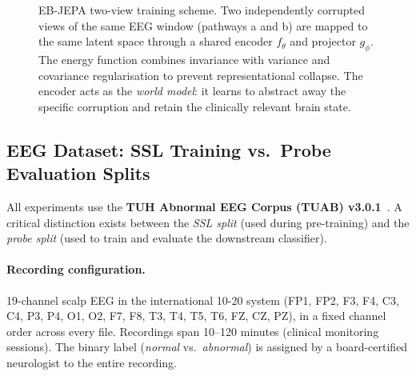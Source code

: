 \documentclass[11pt,a4paper]{article}
\begin{document}
\begin{figure}[htbp]
\centering
{}
\caption{EB-JEPA two-view training scheme.  Two independently corrupted views of the
same EEG window (pathways a and b) are mapped to the same latent space through a shared
encoder $f_\theta$ and projector $g_\phi$.  The energy function combines invariance
with variance and covariance regularisation to prevent representational collapse.
The encoder acts as the \emph{world model}: it learns to abstract away the specific
corruption and retain the clinically relevant brain state.}
\label{fig:ebjepa}
\end{figure}

\subsection{EEG Dataset: SSL Training vs.\ Probe Evaluation Splits}
\label{sec:dataset}

All experiments use the \textbf{TUH Abnormal EEG Corpus (TUAB) v3.0.1}~\cite{tuab}.
A critical distinction exists between the \emph{SSL split} (used during pre-training)
and the \emph{probe split} (used to train and evaluate the downstream classifier).

\paragraph{Recording configuration.}
19-channel scalp EEG in the international 10-20 system (FP1, FP2, F3, F4, C3, C4,
P3, P4, O1, O2, F7, F8, T3, T4, T5, T6, FZ, CZ, PZ), in a fixed channel order
across every file.  Recordings span 10--120 minutes (clinical monitoring sessions).
The binary label (\emph{normal} vs.\ \emph{abnormal}) is assigned by a board-certified
neurologist to the entire recording.
\end{document}
